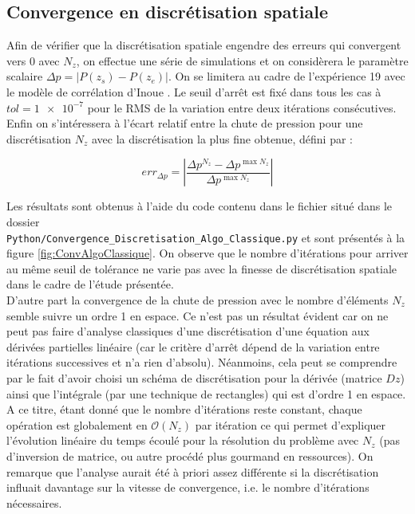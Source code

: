\subsection{Convergence en discrétisation spatiale}

Afin de vérifier que la discrétisation spatiale engendre des erreurs qui convergent vers 0 avec $N_z$, on effectue une série de simulations et on considèrera le paramètre scalaire $\Delta p = \left| P(z_s)-P(z_e) \right|$.  On se limitera au cadre de l'expérience 19 avec le modèle de corrélation d'Inoue \cite{inoueInbundleVoidMeasurement1993}. Le seuil d'arrêt est fixé dans tous les cas à $tol = \num{1e-7}$ pour le RMS de la variation entre deux itérations consécutives. Enfin on s'intéressera à l'écart relatif entre la chute de pression pour une discrétisation $N_z$ avec la discrétisation la plus fine obtenue, défini par :

\begin{equation}
    err_{\Delta p} = \left|\frac{ \Delta p^{N_z} - \Delta p ^{\max{N_z}} }{\Delta p ^{\max{N_z}}}\right|
\end{equation}

Les résultats sont obtenus à l'aide du code contenu dans le fichier situé dans le dossier\\ \texttt{Python/Convergence\_Discretisation\_Algo\_Classique.py} et sont présentés à la figure \ref{fig:ConvAlgoClassique}. On observe que le nombre d'itérations pour arriver au même seuil de tolérance ne varie pas avec la finesse de discrétisation spatiale dans le cadre de l'étude présentée.\\

D'autre part la convergence de la chute de pression avec le nombre d'éléments $N_z$ semble suivre un ordre 1 en espace. Ce n'est pas un résultat évident car on ne peut pas faire d'analyse classiques d'une discrétisation d'une équation aux dérivées partielles linéaire (car le critère d'arrêt dépend de la variation entre itérations successives et n'a rien d'absolu). Néanmoins, cela peut se comprendre par le fait d'avoir choisi un schéma de discrétisation pour la dérivée (matrice $Dz$) ainsi que l'intégrale (par une technique de rectangles) qui est d'ordre 1 en espace. \\

A ce titre, étant donné que le nombre d'itérations reste constant, chaque opération est globalement en $\mathcal{O}(N_z)$ par itération ce qui permet d'expliquer l'évolution linéaire du temps écoulé pour la résolution du problème avec $N_z$ (pas d'inversion de matrice, ou autre procédé plus gourmand en ressources). On remarque que l'analyse aurait été à priori assez différente si la discrétisation influait davantage sur la vitesse de convergence, i.e. le nombre d'itérations nécessaires.\\


